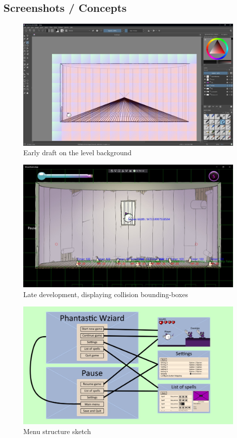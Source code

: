 \documentclass[12pt]{article}
\begin{document}
\subsection{Screenshots / Concepts}

\begin{figure}[H]
    \centering
    \includegraphics[max width=\textwidth]{images/002.JPG}
    \caption{Early draft on the level background}
\end{figure}

\begin{figure}[H]
    \centering
    \includegraphics[max width=\textwidth]{images/019.JPG}
    \caption{Late development, displaying collision bounding-boxes}
\end{figure}

\begin{figure}[H]
    \centering
    \includegraphics[max width=\textwidth]{images/menu_structure.jpg}
    \caption{Menu structure sketch}
\end{figure}
\end{document}
